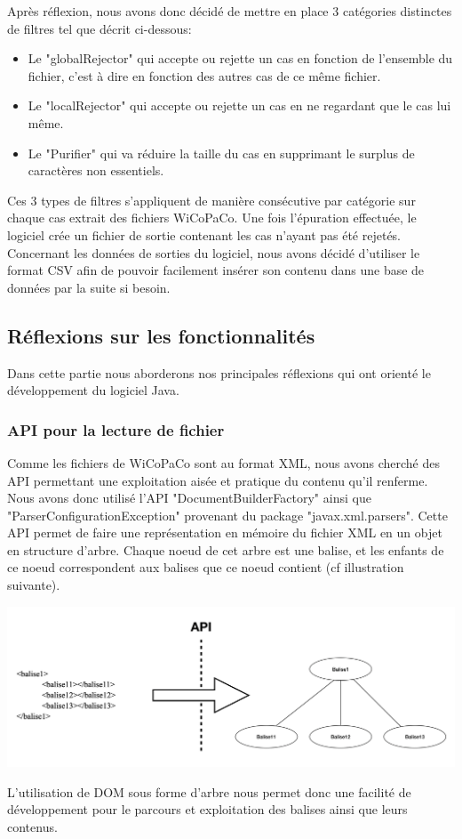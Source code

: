 \documentclass{article}
\begin{document}
Apr\`{e}s r\'{e}flexion, nous avons donc d\'{e}cid\'{e} de mettre en place 3 cat\'{e}gories distinctes de filtres tel que d\'{e}crit ci-dessous:
\begin{itemize}
\item Le "globalRejector" qui accepte ou rejette un cas en fonction de l'ensemble du fichier, c'est \`{a} dire en fonction des autres cas de ce m\^{e}me fichier.
\item Le "localRejector" qui accepte ou rejette un cas en ne regardant que le cas lui m\^{e}me.
\item Le "Purifier" qui va r\'{e}duire la taille du cas en supprimant le surplus de caract\`{e}res non essentiels.
\end{itemize}
Ces 3 types de filtres s'appliquent de mani\`{e}re cons\'{e}cutive par cat\'{e}gorie sur chaque cas extrait des fichiers WiCoPaCo. Une fois l'\'{e}puration effectu\'{e}e, le logiciel cr\'{e}e un fichier de sortie contenant les cas n'ayant pas \'{e}t\'{e} rejet\'{e}s. Concernant les donn\'{e}es de sorties du logiciel, nous avons d\'{e}cid\'{e} d'utiliser le format CSV afin de pouvoir facilement ins\'{e}rer son contenu dans une base de donn\'{e}es par la suite si besoin.

\subsection{R\'{e}flexions sur les fonctionnalit\'{e}s}
Dans cette partie nous aborderons nos principales r\'{e}flexions qui ont orient\'{e} le d\'{e}veloppement du logiciel Java.
\subsubsection{API pour la lecture de fichier}
Comme les fichiers de WiCoPaCo sont au format XML, nous avons cherch\'{e} des API permettant une exploitation ais\'{e}e et pratique du contenu qu'il renferme. Nous avons donc utilis\'{e} l'API "DocumentBuilderFactory" ainsi que "ParserConfigurationException" provenant du package "javax.xml.parsers". Cette API permet de faire une repr\'{e}sentation en m\'{e}moire du fichier XML en un objet en structure d'arbre. Chaque noeud de cet arbre est une balise, et les enfants de ce noeud correspondent aux balises que ce noeud contient (cf illustration suivante). 

\begin{center}
\includegraphics[width=14cm]{exemple9.png} %
\end{center}
L'utilisation de DOM sous forme d'arbre nous permet donc une facilit\'{e} de d\'{e}veloppement pour le parcours et exploitation des balises ainsi que leurs contenus.
\end{document}
